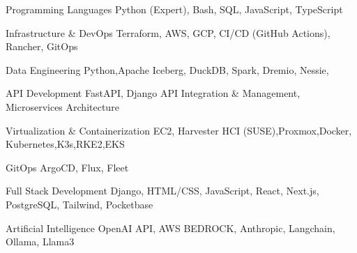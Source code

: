 


\begin{cvskills}


\cvskill
{Programming Languages} %
{Python (Expert), Bash, SQL, JavaScript, TypeScript} %


\cvskill
{Infrastructure \& DevOps} %
{Terraform, AWS, GCP, CI/CD (GitHub Actions), Rancher, GitOps} %



\cvskill
{Data Engineering} %
{Python,Apache Iceberg, DuckDB, Spark, Dremio, Nessie, } %


\cvskill
{API Development} %
{FastAPI, Django API Integration \& Management, Microservices Architecture} %


\cvskill
{Virtualization \& Containerization} %
{EC2, Harvester HCI (SUSE),Proxmox,Docker, Kubernetes,K3s,RKE2,EKS} %


\cvskill
{GitOps} %
{ArgoCD, Flux, Fleet} %


\cvskill
{Full Stack Development} %
{Django, HTML/CSS, JavaScript, React, Next.js, PostgreSQL, Tailwind, Pocketbase} %


\cvskill
{Artificial Intelligence} %
{OpenAI API, AWS BEDROCK, Anthropic, Langchain, Ollama, Llama3} %


\end{cvskills}
